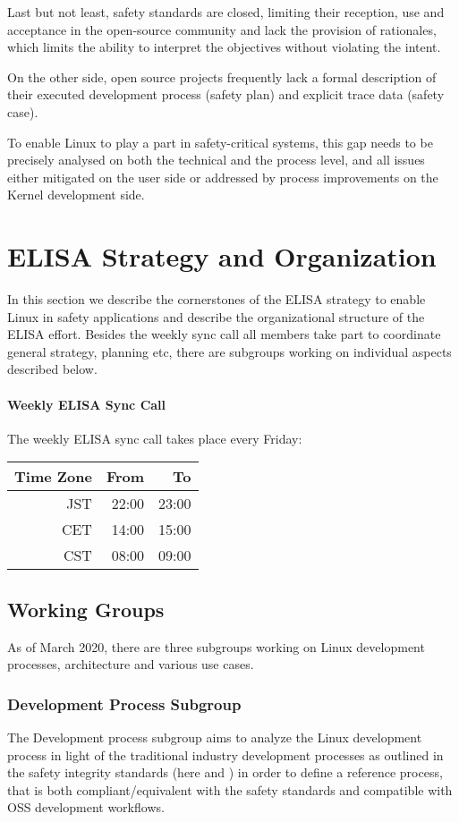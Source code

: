 \documentclass[12pt]{ElisaPaper}
\begin{document}
Last but not least, safety standards are closed, limiting their reception, use and acceptance in the open-source community and lack the provision of rationales, which limits the ability to interpret the objectives without violating the intent.

On the other side, open source projects frequently lack a formal description of their executed development process (safety plan) and explicit trace data (safety case).

To enable Linux to play a part in safety-critical systems, this gap needs to be precisely analysed on both the technical and the process level, and all issues either mitigated on the user side or addressed by process improvements on the Kernel development side.

\section{ELISA Strategy and Organization}
In this section we describe the cornerstones of the ELISA strategy to enable Linux in safety applications and describe the organizational structure of the ELISA effort.
Besides the weekly sync call all members take part to coordinate general strategy, planning etc, there are subgroups working on individual aspects described below.
\paragraph{Weekly ELISA Sync Call}
The weekly ELISA sync call takes place every Friday:
\begin{center}
	\begin{tabular}{rrr}
		\toprule
		Time Zone & From & To\\
		\midrule
		JST & 22:00 & 23:00 \\
		CET	& 14:00 & 15:00 \\
		CST & 08:00 & 09:00 \\
		\bottomrule
	\end{tabular} 
\end{center}
\subsection{Working Groups}
As of March 2020, there are three subgroups working on Linux development processes, architecture and various use cases.
\subsubsection{Development Process Subgroup}
\label{sssec:Development Process Subgroup}
The Development process subgroup aims to analyze the Linux development process in light of the traditional industry development processes as outlined in the safety integrity standards (here \cite{IEC61508:2010} and \cite{ISO26262:2018}) in order to define a reference process, that is both compliant/equivalent with the safety standards and compatible with OSS development workflows.
\end{document}
